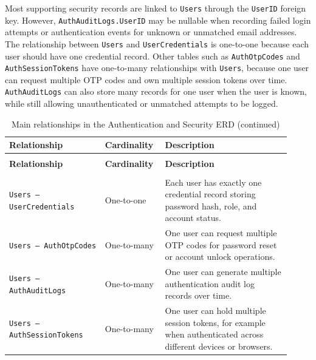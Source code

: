 ﻿\documentclass{article}
\begin{document}
Most supporting security records are linked to \texttt{Users} through the \texttt{UserID} foreign
key. However, \texttt{AuthAuditLogs.UserID} may be nullable when recording failed login attempts
or authentication events for unknown or unmatched email addresses. The relationship between
\texttt{Users} and \texttt{UserCredentials} is one-to-one because each user should have one
credential record. Other tables such as \texttt{AuthOtpCodes} and \texttt{AuthSessionTokens}
have one-to-many relationships with \texttt{Users}, because one user can request multiple OTP
codes and own multiple session tokens over time. \texttt{AuthAuditLogs} can also store many
records for one user when the user is known, while still allowing unauthenticated or unmatched
attempts to be logged.

\begin{longtable}{
    >{\raggedright\arraybackslash}p{0.32\linewidth}
    >{\centering\arraybackslash}p{0.18\linewidth}
    J{0.42\linewidth}
}
\caption{Main relationships in the Authentication and Security ERD}
\label{tab:auth-security-relationships} \\

\toprule
\textbf{Relationship} & \textbf{Cardinality} & \textbf{Description} \\
\midrule
\endfirsthead

\caption[]{Main relationships in the Authentication and Security ERD (continued)} \\

\toprule
\textbf{Relationship} & \textbf{Cardinality} & \textbf{Description} \\
\midrule
\endhead

\midrule
{} \\
\endfoot

\bottomrule
\endlastfoot

\texttt{Users -- UserCredentials}
& One-to-one
& Each user has exactly one credential record storing password hash, role, and account status. \\

\texttt{Users -- AuthOtpCodes}
& One-to-many
& One user can request multiple OTP codes for password reset or account unlock operations. \\

\texttt{Users -- AuthAuditLogs}
& One-to-many
& One user can generate multiple authentication audit log records over time. \\

\texttt{Users -- AuthSessionTokens}
& One-to-many
& One user can hold multiple session tokens, for example when authenticated across different devices or browsers. \\

\end{longtable}
\end{document}
